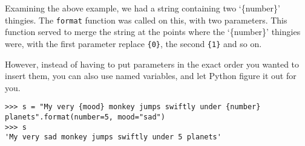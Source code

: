 Examining the above example, we had a string containing two `\{number\}' thingies.      The \texttt{format} function was called on this, with two parameters.    This function served to merge the string at the points where   the `\{number\}' thingies were, with the first parameter replace \texttt{\{0\}}, the second \texttt{\{1\}} and so on.     

However, instead of having to put parameters in the exact order you wanted to insert     them, you can also use named variables, and let Python figure it out for you. 
\begin{lstlisting}
>>> s = "My very {mood} monkey jumps swiftly under {number} planets".format(number=5, mood="sad")
>>> s
'My very sad monkey jumps swiftly under 5 planets'
\end{lstlisting}

